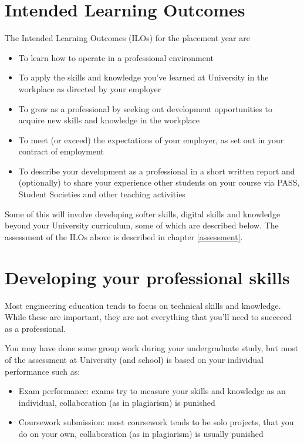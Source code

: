 \documentclass[
]{book}
\providecommand{\tightlist}{%
  \setlength{\itemsep}{0pt}\setlength{\parskip}{0pt}}
\begin{document}
\section{Intended Learning Outcomes}\label{ilos}

The Intended Learning Outcomes (ILOs) for the placement year are

\begin{itemize}
\tightlist
\item
  To learn how to operate in a professional environment
\item
  To apply the skills and knowledge you've learned at University in the workplace as directed by your employer
\item
  To grow as a professional by seeking out development opportunities to acquire new skills and knowledge in the workplace
\item
  To meet (or exceed) the expectations of your employer, as set out in your contract of employment
\item
  To describe your development as a professional in a short written report and (optionally) to share your experience other students on your course via PASS, Student Societies and other teaching activities
\end{itemize}

Some of this will involve developing softer skills, digital skills and knowledge beyond your University curriculum, some of which are described below. The assessment of the ILOs above is described in chapter \ref{assessment}.

\section{Developing your professional skills}\label{soft}

Most engineering education tends to focus on technical skills and knowledge. While these are important, they are not everything that you'll need to succeeed as a professional.

You may have done some group work during your undergraduate study, but most of the assessment at University (and school) is based on your individual performance such as:

\begin{itemize}
\tightlist
\item
  Exam performance: exams try to measure your skills and knowledge as an individual, collaboration (as in plagiarism) is punished
\item
  Coursework submission: most coursework tends to be solo projects, that you do on your own, collaboration (as in plagiarism) is usually punished
\end{itemize}
\end{document}
